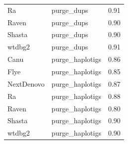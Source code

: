 \begin{suppsection}
\begin{table}[ht]
\begin{adjustbox}{totalheight=\baselineskip}
\begin{tabular}{llc}
Ra & purge\_dups & 0.91 \\
Raven & purge\_dups & 0.90 \\
Shasta & purge\_dups & 0.90 \\
wtdbg2 & purge\_dups & 0.91 \\
Canu & purge\_haplotigs & 0.86 \\
Flye & purge\_haplotigs & 0.85 \\
NextDenovo & purge\_haplotigs & 0.87 \\
Ra & purge\_haplotigs & 0.88 \\
Raven & purge\_haplotigs & 0.80 \\
Shasta & purge\_haplotigs & 0.90 \\
wtdbg2 & purge\_haplotigs & 0.90 \\
\hline
\end{tabular}
\end{adjustbox}
\label{tab:pacbio_happy_part1}
\end{table}


\end{suppsection}
